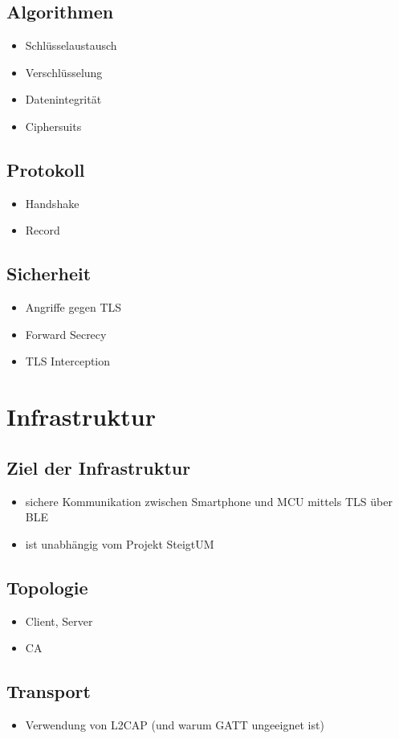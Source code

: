 \documentclass[doktyp=barbeit]{TUBAFarbeiten}
\begin{document}
\subsection{Algorithmen}
\begin{itemize}
	\item Schlüsselaustausch
	\item Verschlüsselung
	\item Datenintegrität
	\item Ciphersuits
\end{itemize}
\subsection{Protokoll}
\begin{itemize}
	\item Handshake
	\item Record
\end{itemize}
\subsection{Sicherheit}
\begin{itemize}
	\item Angriffe gegen TLS
	\item Forward Secrecy
	\item TLS Interception
\end{itemize}

\section{Infrastruktur}
\subsection{Ziel der Infrastruktur}
\begin{itemize}
	\item sichere Kommunikation zwischen Smartphone und MCU mittels TLS über BLE
	\item ist unabhängig vom Projekt SteigtUM
\end{itemize}
\subsection{Topologie}
\begin{itemize}
	\item Client, Server
	\item CA
\end{itemize}
\subsection{Transport}
\begin{itemize}
	\item Verwendung von L2CAP (und warum GATT ungeeignet ist)
\end{itemize}
\end{document}
